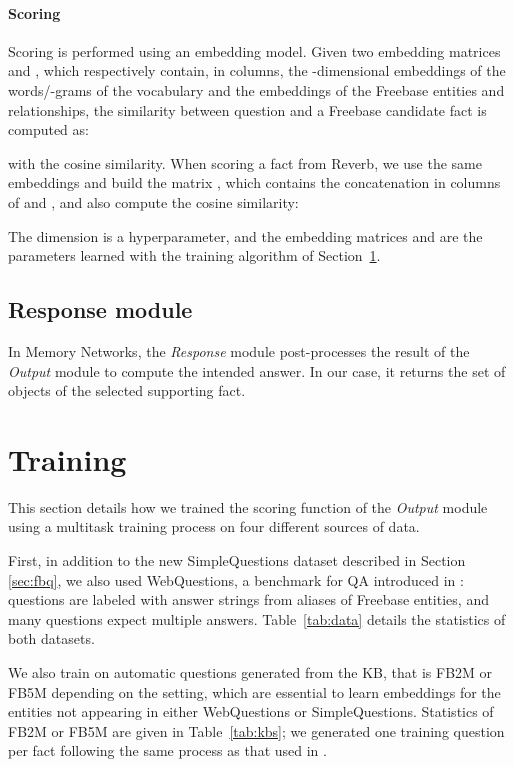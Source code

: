 \documentclass[11pt,a4paper]{article}
\newcommand{\fb}{{\sf Freebase}\xspace}
\newcommand{\wq}{{\sf WebQuestions}\xspace}
\newcommand{\rv}{{\sf Reverb}\xspace}
\newcommand{\fbq}{{\sf SimpleQuestions}\xspace}
\newcommand{\fbs}{{\sf FB2M}\xspace}
\newcommand{\fbb}{{\sf FB5M}\xspace}
\begin{document}
\paragraph{Scoring}
Scoring is performed using an embedding model. Given two embedding
matrices  and , which respectively contain, in columns, the
-dimensional embeddings of the words/-grams of the vocabulary
and the embeddings of the \fb entities and relationships, the
similarity between question  and a \fb candidate fact  is
computed as:

with  the cosine similarity.
When scoring a fact  from \rv, we use the same embeddings and
build the matrix , which
contains the concatenation in columns of  and ,
and also compute the cosine similarity:

The dimension  is a hyperparameter, and the embedding
matrices  and  are the parameters learned
with the training algorithm of Section~\ref{sec:training}.

\subsection{Response module}
In Memory Networks, the {\it Response} module post-processes the
result of the {\it Output} module to compute the intended answer. In
our case, it returns the set of objects of the selected supporting
fact.




\section{Training}
\label{sec:training}

This section details how we trained the scoring function of the {\it
  Output} module using a multitask training process on
four different sources of data. 

First, in addition to the new \fbq dataset described in Section
\ref{sec:fbq}, we also used \wq, a benchmark for QA 
introduced in \cite{berant-EtAl:2013:EMNLP}: questions are labeled with answer
strings from aliases of \fb entities, and many questions expect
multiple answers.
Table~\ref{tab:data} details the statistics of both datasets.


We also train on automatic questions generated from the KB, that is
\fbs or \fbb depending on the setting, which are essential to learn
embeddings for the entities not appearing in either \wq or \fbq.
Statistics of \fbs or \fbb are given in Table~\ref{tab:kbs}; we
generated one training question per fact following the same process 
as that used in \cite{bordes-chopra-weston:2014:EMNLP2014}.
\end{document}
